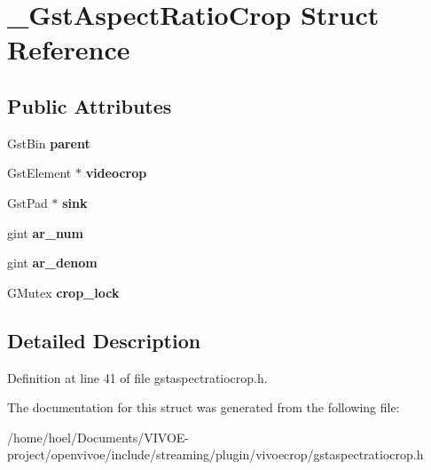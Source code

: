 \hypertarget{struct__GstAspectRatioCrop}{}\section{\+\_\+\+Gst\+Aspect\+Ratio\+Crop Struct Reference}
\label{struct__GstAspectRatioCrop}
\subsection*{Public Attributes}
\begin{DoxyCompactItemize}
\item 
Gst\+Bin {\bfseries parent}\hypertarget{struct__GstAspectRatioCrop_a98f618253354c05c73cbcbd575551997}{}\label{struct__GstAspectRatioCrop_a98f618253354c05c73cbcbd575551997}

\item 
Gst\+Element $\ast$ {\bfseries videocrop}\hypertarget{struct__GstAspectRatioCrop_ab7055ebceb7df6fc9df8341ba3f4e59c}{}\label{struct__GstAspectRatioCrop_ab7055ebceb7df6fc9df8341ba3f4e59c}

\item 
Gst\+Pad $\ast$ {\bfseries sink}\hypertarget{struct__GstAspectRatioCrop_af48a4d5b2c4da9ab462a9af8b65e4c12}{}\label{struct__GstAspectRatioCrop_af48a4d5b2c4da9ab462a9af8b65e4c12}

\item 
gint {\bfseries ar\+\_\+num}\hypertarget{struct__GstAspectRatioCrop_a8761a00e46b28986df9a84287b481eeb}{}\label{struct__GstAspectRatioCrop_a8761a00e46b28986df9a84287b481eeb}

\item 
gint {\bfseries ar\+\_\+denom}\hypertarget{struct__GstAspectRatioCrop_acb41d43b9d401bd321d4260050df1a53}{}\label{struct__GstAspectRatioCrop_acb41d43b9d401bd321d4260050df1a53}

\item 
G\+Mutex {\bfseries crop\+\_\+lock}\hypertarget{struct__GstAspectRatioCrop_ae3e1ce8fdc3aa6308213bd6a3a38b22b}{}\label{struct__GstAspectRatioCrop_ae3e1ce8fdc3aa6308213bd6a3a38b22b}

\end{DoxyCompactItemize}


\subsection{Detailed Description}


Definition at line 41 of file gstaspectratiocrop.\+h.



The documentation for this struct was generated from the following file\+:\begin{DoxyCompactItemize}
\item 
/home/hoel/\+Documents/\+V\+I\+V\+O\+E-\/project/openvivoe/include/streaming/plugin/vivoecrop/gstaspectratiocrop.\+h\end{DoxyCompactItemize}
